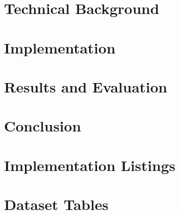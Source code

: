 \documentclass[ %
                author={Ainsley Rutterford},
                supervisor={Dr. Tilo Burghardt},
                degree={MEng},
                title={Volumetric Coral Analysis using Deep Learning},
                subtitle={},
                type={research},
                year={2020} ]{dissertation}
\begin{document}
\chapter{Technical Background}
\label{chap:technical}


\chapter{Implementation}
\label{chap:implementation}


\chapter{Results and Evaluation}
\label{chap:evaluation}


\chapter{Conclusion}
\label{chap:conclusion}


\backmatter



\appendix

\chapter{Implementation Listings}
\label{appx:implementationlistings}


\chapter{Dataset Tables}
\label{appx:datasettables}
% 
\end{document}
